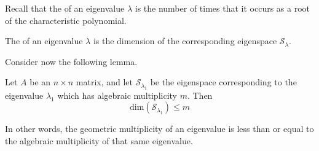 \documentclass{ximera}
\begin{document}
Recall that the  of an eigenvalue $\lambda$ is the number of times that it occurs as a root of the characteristic polynomial.

\begin{definition}\label{def:geommulteig}
The  of an eigenvalue $\lambda$ is the dimension of the corresponding eigenspace $\mathcal{S}_\lambda$.
\end{definition}

Consider now the following lemma.

\begin{lemma}\label{lemma:dimeigenspace}
Let $A$ be an $n\times n$ matrix, and let $\mathcal{S}_{\lambda_1}$ be the eigenspace corresponding to the eigenvalue $\lambda_1$ which has algebraic multiplicity $m$.  Then
$$\mbox{dim}(\mathcal{S}_{\lambda_1})\leq m$$
\end{lemma}

In other words, the geometric multiplicity of an eigenvalue is less than or equal to the algebraic multiplicity of that same eigenvalue.
\end{document}
